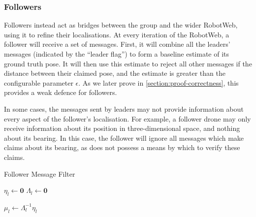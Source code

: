 \subsubsection{Followers}
Followers instead act as bridges between the group and the wider RobotWeb, using it to refine their localisations. At every iteration of the RobotWeb, a follower will receive a set of messages. First, it will combine all the leaders' messages (indicated by the ``leader flag'') to form a baseline estimate of its ground truth pose. It will then use this estimate to reject all other messages if the distance between their claimed pose, and the estimate is greater than the configurable parameter $\epsilon$. As we later prove in \autoref{section:proof-correctness}, this provides a weak defence for followers. 

In some cases, the messages sent by leaders may not provide information about every aspect of the follower's localisation. For example, a follower drone may only receive information about its position in three-dimensional space, and nothing about its bearing. In this case, the follower will ignore all messages which make claims about its bearing, as does not possess a means by which to verify these claims. 

\begin{algorithm}[H]
\DontPrintSemicolon
\caption{Follower Message Filter}\label{alg:follower-msg-filter}

\BlankLine
{}
$\eta_l \leftarrow \mathbf{0}$\; 
$\Lambda_l \leftarrow \mathbf{0}$\; 
 
 $\mu_l \leftarrow \Lambda_l^{-1} \eta_l$ 
 
\BlankLine
{}

\end{algorithm}

